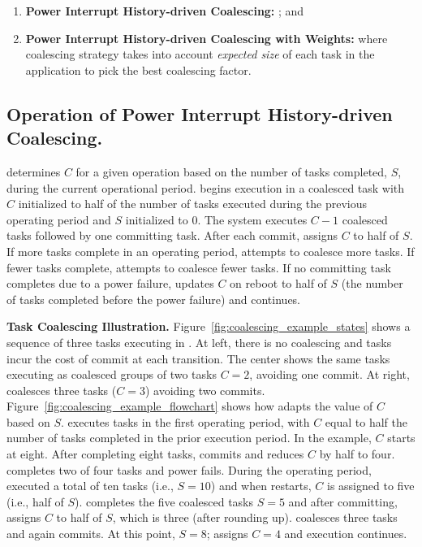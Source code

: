 \begin{enumerate}
	\item \textbf{Power Interrupt History-driven Coalescing:} ; and 
	\item \textbf{Power Interrupt History-driven Coalescing with Weights:} where coalescing strategy takes into account \emph{expected size} of each task in the application to pick the best coalescing factor.
\end{enumerate}

\subsection{Operation of Power Interrupt History-driven Coalescing.} \sys determines $C$ for a given operation based on the number of tasks completed, $S$, during the current operational period. \sys begins execution in a coalesced task with $C$ initialized to half of the number of tasks executed during the previous operating period and $S$ initialized to $0$. The system executes $C-1$ coalesced tasks followed by one committing task. After each commit, \sys assigns $C$ to half of $S$. If more tasks complete in an operating period, \sys attempts to coalesce more tasks. If fewer tasks complete, \sys attempts to coalesce fewer tasks. If no committing task completes due to a power failure, \sys updates $C$ on reboot to half of $S$ (the number of tasks completed before the power failure) and continues.

\textbf{Task Coalescing Illustration.} Figure~\ref{fig:coalescing_example_states} shows a sequence of three tasks executing in \sys. At left, there is no coalescing and tasks incur the cost of commit at each transition. The center shows the same tasks executing as coalesced groups of two tasks $C=2$, avoiding one commit.  At right, \sys
coalesces three tasks ($C=3$) avoiding two commits. Figure~\ref{fig:coalescing_example_flowchart} shows how \sys adapts the value
of $C$ based on $S$. \sys executes tasks in the first operating period, with
$C$ equal to half the number of tasks completed in the prior execution period.
In the example, $C$ starts at eight. After completing eight tasks, \sys commits
and reduces $C$ by half to four.  \sys completes two of four tasks and power
fails.  During the operating period, \sys executed a total of ten tasks (i.e.,
$S=10$) and when \sys restarts, $C$ is assigned to five (i.e., half of $S$).
\sys completes the five coalesced tasks $S=5$ and after committing, assigns $C$
to half of $S$, which is three (after rounding up). \sys coalesces three tasks
and again commits.  At this point, $S=8$; \sys assigns $C=4$ and execution
continues.

